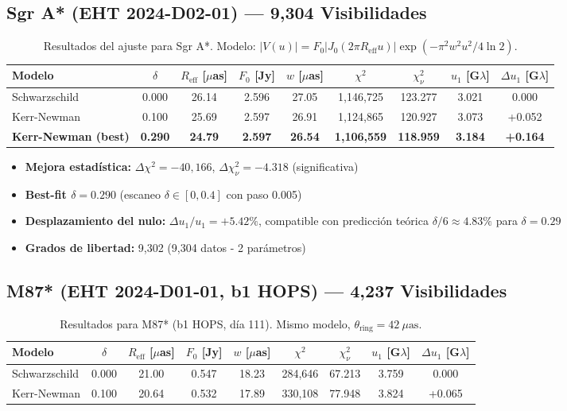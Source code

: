 \documentclass[12pt,a4paper]{article}
\begin{document}
\subsection{Sgr A* (EHT 2024-D02-01) — 9,304 Visibilidades}

\begin{table}[H]
\centering
\caption{Resultados del ajuste para Sgr A*. Modelo: $|V(u)| = F_0 |J_0(2\pi R_{\text{eff}} u)| \exp(-\pi^2 w^2 u^2/4\ln 2)$.}
\label{tab:sgra_results}
\begin{tabular}{lcccccccc}
\toprule
Modelo & $\delta$ & $R_{\text{eff}}$ [$\mu$as] & $F_0$ [Jy] & $w$ [$\mu$as] & $\chi^2$ & $\chi^2_\nu$ & $u_1$ [G$\lambda$] & $\Delta u_1$ [G$\lambda$] \\
\midrule
Schwarzschild & 0.000 & 26.14 & 2.596 & 27.05 & 1,146,725 & 123.277 & 3.021 & 0.000 \\
Kerr-Newman & 0.100 & 25.69 & 2.597 & 26.91 & 1,124,865 & 120.927 & 3.073 & +0.052 \\
\bfseries Kerr-Newman (best) & \bfseries 0.290 & \bfseries 24.79 & \bfseries 2.597 & \bfseries 26.54 & \bfseries 1,106,559 & \bfseries 118.959 & \bfseries 3.184 & \bfseries +0.164 \\
\bottomrule
\end{tabular}
\end{table}

\begin{itemize}
    \item \textbf{Mejora estadística:} $\Delta\chi^2 = -40,166$, $\Delta\chi^2_\nu = -4.318$ (significativa)
    \item \textbf{Best-fit $\delta = 0.290$} (escaneo $\delta \in [0, 0.4]$ con paso 0.005)
    \item \textbf{Desplazamiento del nulo:} $\Delta u_1/u_1 = +5.42\%$, compatible con predicción teórica $\delta/6 \approx 4.83\%$ para $\delta=0.29$
    \item \textbf{Grados de libertad:} 9,302 (9,304 datos - 2 parámetros)
\end{itemize}

\subsection{M87* (EHT 2024-D01-01, b1 HOPS) — 4,237 Visibilidades}

\begin{table}[H]
\centering
\caption{Resultados para M87* (b1 HOPS, día 111). Mismo modelo, $\theta_{\text{ring}} = 42 \ \mu\text{as}$.}
\label{tab:m87_results}
\begin{tabular}{lcccccccc}
\toprule
Modelo & $\delta$ & $R_{\text{eff}}$ [$\mu$as] & $F_0$ [Jy] & $w$ [$\mu$as] & $\chi^2$ & $\chi^2_\nu$ & $u_1$ [G$\lambda$] & $\Delta u_1$ [G$\lambda$] \\
\midrule
Schwarzschild & 0.000 & 21.00 & 0.547 & 18.23 & 284,646 & 67.213 & 3.759 & 0.000 \\
Kerr-Newman & 0.100 & 20.64 & 0.532 & 17.89 & 330,108 & 77.948 & 3.824 & +0.065 \\
\bottomrule
\end{tabular}
\end{table}
\end{document}
